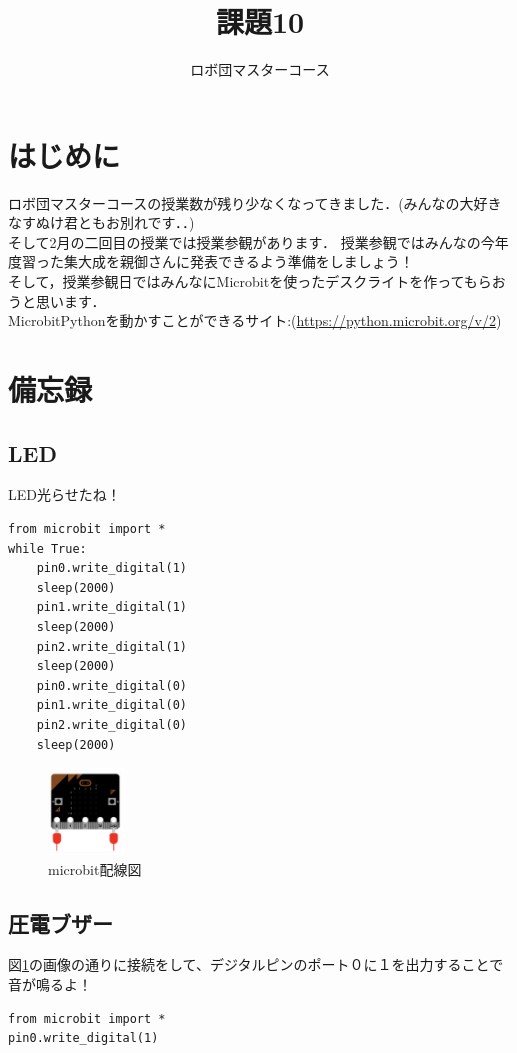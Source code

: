 \documentclass[dvipdfmx]{jsarticle}
\begin{document}
\title{課題10}
\author{ロボ団マスターコース}
\maketitle

\section{はじめに}
ロボ団マスターコースの授業数が残り少なくなってきました．(みんなの大好きなすぬけ君ともお別れです．．)\\
そして2月の二回目の授業では授業参観があります．
授業参観ではみんなの今年度習った集大成を親御さんに発表できるよう準備をしましょう！\\
そして，授業参観日ではみんなにMicrobitを使ったデスクライトを作ってもらおうと思います．\\
MicrobitPythonを動かすことができるサイト:(\url{https://python.microbit.org/v/2})
\section{備忘録}
\subsection{LED}
LED光らせたね！
\begin{lstlisting} 
from microbit import *
while True:
    pin0.write_digital(1)
    sleep(2000)
    pin1.write_digital(1)
    sleep(2000)
    pin2.write_digital(1)
    sleep(2000)
    pin0.write_digital(0)
    pin1.write_digital(0)
    pin2.write_digital(0)
    sleep(2000)
\end{lstlisting}
\begin{figure}[H]
\centering
\includegraphics[width=2cm]{1.png}
\caption{microbit配線図}
\label{haisen}
\end{figure}
\subsection{圧電ブザー}
図\ref{haisen}の画像の通りに接続をして、デジタルピンのポート０に１を出力することで音が鳴るよ！\\
\begin{lstlisting} 
from microbit import *
pin0.write_digital(1)
\end{lstlisting}
\end{document}
